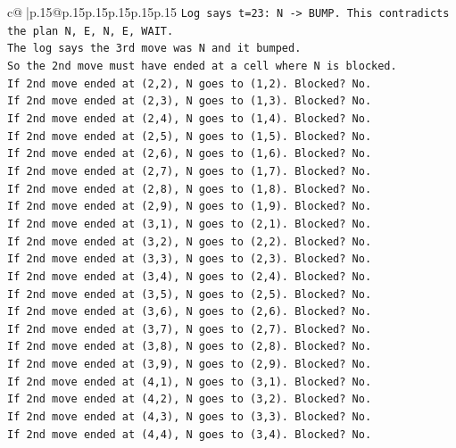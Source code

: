 \documentclass{article}
\begin{document}
{\begin{supertabular}{c@{$\;$}|p{.15\linewidth}@{}p{.15\linewidth}p{.15\linewidth}p{.15\linewidth}p{.15\linewidth}p{.15\linewidth}}
{{{\texttt{Log says t=23: N {-}> BUMP. This contradicts the plan N, E, N, E, WAIT.} \\
\texttt{The log says the 3rd move was N and it bumped.} \\
\texttt{So the 2nd move must have ended at a cell where N is blocked.} \\
\texttt{If 2nd move ended at (2,2), N goes to (1,2). Blocked? No.} \\
\texttt{If 2nd move ended at (2,3), N goes to (1,3). Blocked? No.} \\
\texttt{If 2nd move ended at (2,4), N goes to (1,4). Blocked? No.} \\
\texttt{If 2nd move ended at (2,5), N goes to (1,5). Blocked? No.} \\
\texttt{If 2nd move ended at (2,6), N goes to (1,6). Blocked? No.} \\
\texttt{If 2nd move ended at (2,7), N goes to (1,7). Blocked? No.} \\
\texttt{If 2nd move ended at (2,8), N goes to (1,8). Blocked? No.} \\
\texttt{If 2nd move ended at (2,9), N goes to (1,9). Blocked? No.} \\
\texttt{If 2nd move ended at (3,1), N goes to (2,1). Blocked? No.} \\
\texttt{If 2nd move ended at (3,2), N goes to (2,2). Blocked? No.} \\
\texttt{If 2nd move ended at (3,3), N goes to (2,3). Blocked? No.} \\
\texttt{If 2nd move ended at (3,4), N goes to (2,4). Blocked? No.} \\
\texttt{If 2nd move ended at (3,5), N goes to (2,5). Blocked? No.} \\
\texttt{If 2nd move ended at (3,6), N goes to (2,6). Blocked? No.} \\
\texttt{If 2nd move ended at (3,7), N goes to (2,7). Blocked? No.} \\
\texttt{If 2nd move ended at (3,8), N goes to (2,8). Blocked? No.} \\
\texttt{If 2nd move ended at (3,9), N goes to (2,9). Blocked? No.} \\
\texttt{If 2nd move ended at (4,1), N goes to (3,1). Blocked? No.} \\
\texttt{If 2nd move ended at (4,2), N goes to (3,2). Blocked? No.} \\
\texttt{If 2nd move ended at (4,3), N goes to (3,3). Blocked? No.} \\
\texttt{If 2nd move ended at (4,4), N goes to (3,4). Blocked? No.} \\
}}}
\end{supertabular}}
\end{document}
